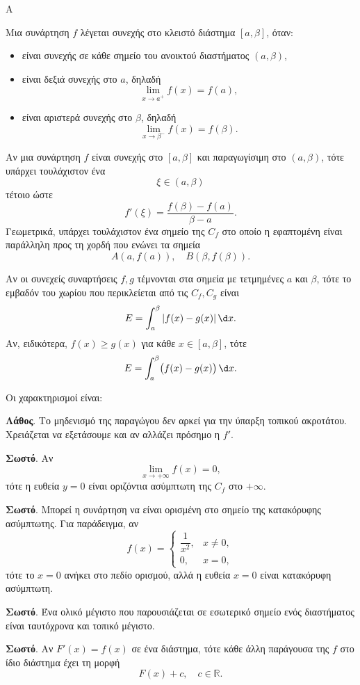 \begin{thema}{Α}
\begin{erwthma}
\item Μια συνάρτηση $f$ λέγεται συνεχής στο κλειστό διάστημα $[a,\beta]$, όταν:
\begin{itemize}
\item είναι συνεχής σε κάθε σημείο του ανοικτού διαστήματος $(a,\beta)$,
\item είναι δεξιά συνεχής στο $a$, δηλαδή
\[
\lim_{x\to a^+}f(x)=f(a),
\]
\item είναι αριστερά συνεχής στο $\beta$, δηλαδή
\[
\lim_{x\to \beta^-}f(x)=f(\beta).
\]
\end{itemize}

\item Αν μια συνάρτηση $f$ είναι συνεχής στο $[a,\beta]$ και παραγωγίσιμη στο $(a,\beta)$, τότε υπάρχει τουλάχιστον ένα
\[
\xi\in(a,\beta)
\]
τέτοιο ώστε
\[
f'(\xi)=\frac{f(\beta)-f(a)}{\beta-a}.
\]
Γεωμετρικά, υπάρχει τουλάχιστον ένα σημείο της $C_f$ στο οποίο η εφαπτομένη είναι παράλληλη προς τη χορδή που ενώνει τα σημεία
\[
A(a,f(a)),\quad B(\beta,f(\beta)).
\]

\item Αν οι συνεχείς συναρτήσεις $f,g$ τέμνονται στα σημεία με τετμημένες $a$ και $\beta$, τότε το εμβαδόν του χωρίου που περικλείεται από τις $C_f,C_g$ είναι
\[
E=\dint_a^\beta |f(x)-g(x)|\,\d x.
\]
Αν, ειδικότερα, $f(x)\geq g(x)$ για κάθε $x\in[a,\beta]$, τότε
\[
E=\dint_a^\beta \bigl(f(x)-g(x)\bigr)\,\d x.
\]

\item Οι χαρακτηρισμοί είναι:
\begin{alist}
\item \textbf{Λάθος}. Το μηδενισμό της παραγώγου δεν αρκεί για την ύπαρξη τοπικού ακροτάτου. Χρειάζεται να εξετάσουμε και αν αλλάζει πρόσημο η $f'$.
\item \textbf{Σωστό}. Αν
\[
\lim_{x\to+\infty}f(x)=0,
\]
τότε η ευθεία $y=0$ είναι οριζόντια ασύμπτωτη της $C_f$ στο $+\infty$.
\item \textbf{Σωστό}. Μπορεί η συνάρτηση να είναι ορισμένη στο σημείο της κατακόρυφης ασύμπτωτης. Για παράδειγμα, αν
\[
f(x)=
\begin{cases}
\dfrac{1}{x^2},&x\neq0,\\
0,&x=0,
\end{cases}
\]
τότε το $x=0$ ανήκει στο πεδίο ορισμού, αλλά η ευθεία $x=0$ είναι κατακόρυφη ασύμπτωτη.
\item \textbf{Σωστό}. Ένα ολικό μέγιστο που παρουσιάζεται σε εσωτερικό σημείο ενός διαστήματος είναι ταυτόχρονα και τοπικό μέγιστο.
\item \textbf{Σωστό}. Αν $F'(x)=f(x)$ σε ένα διάστημα, τότε κάθε άλλη παράγουσα της $f$ στο ίδιο διάστημα έχει τη μορφή
\[
F(x)+c,\quad c\in\mathbb{R}.
\]
\end{alist}
\end{erwthma}
\end{thema}

